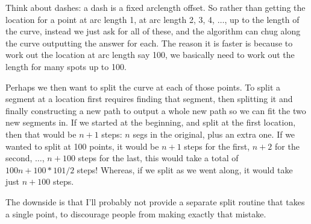 \documentclass[openany]{book}
\begin{document}
Think about dashes: a dash is a fixed arclength offset.  So rather
than getting the location for a point at arc length 1, at arc length
2, 3, 4, $\ldots$, up to the length of the curve, instead we just ask for all of
these, and the algorithm can chug along the curve outputting the
answer for each.  The reason it is faster is because to work out the
location at arc length say 100, we basically need to work out the
length for many spots up to 100.

Perhaps we then want to split the curve at each of those points.  To
split a segment at a location first requires finding that segment,
then splitting it and finally constructing a new path to output a whole
new path so we can fit the two new segments in.  If we started at the
beginning, and split at the first location, then that would be $n+1$ steps: $n$
segs in the original, plus an extra one.  If we wanted to split at 100
points, it would be $n+1$ steps for the first, $n+2$ for the
second, $\ldots$, $n+100$ steps for the last, this would take a total of $100n +
100*101/2$ steps!  Whereas, if we split as we went along, it would take
just $n+100$ steps.

The downside is that I'll probably not provide a separate split
routine that takes a single point, to discourage people from making
exactly that mistake.

\label{chapter:bibliography}
\end{document}
